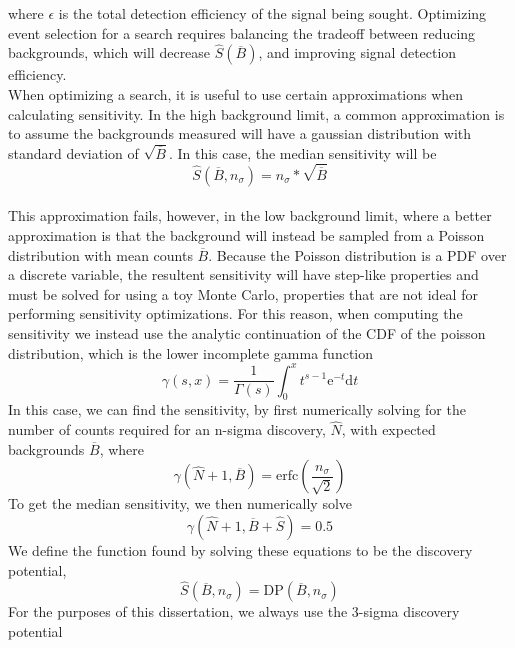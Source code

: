 \documentclass[/main.tex]{subfiles}
\begin{document}
where $\epsilon$ is the total detection efficiency of the signal being sought.
Optimizing event selection for a search requires balancing the tradeoff between reducing backgrounds, which will decrease $\hat{S}(\overline{B})$, and improving signal detection efficiency.
\\
When optimizing a search, it is useful to use certain approximations when calculating sensitivity.
In the high background limit, a common approximation is to assume the backgrounds measured will have a gaussian distribution with standard deviation of $\sqrt{\overline{B}}$.
In this case, the median sensitivity will be
\begin{equation}
  \hat{S}(\overline{B}, n_\sigma)=n_\sigma * \sqrt{\overline{B}}
\end{equation}
\\
This approximation fails, however, in the low background limit, where a better approximation is that the background will instead be sampled from a Poisson distribution with mean counts $\overline{B}$.
Because the Poisson distribution is a PDF over a discrete variable, the resultent sensitivity will have step-like properties and must be solved for using a toy Monte Carlo, properties that are not ideal for performing sensitivity optimizations.
For this reason, when computing the sensitivity we instead use the analytic continuation of the CDF of the poisson distribution, which is the lower incomplete gamma function
\begin{equation}
  \gamma(s, x)=\frac{1}{\Gamma(s)}\int_0^x t^{s-1} \mathrm{e}^{-t} \mathrm{d}t
\end{equation}
In this case, we can find the sensitivity, by first numerically solving for the number of counts required for an n-sigma discovery, $\hat{N}$, with expected backgrounds $\overline{B}$, where
\begin{equation}
  \gamma(\hat{N}+1, \overline{B}) = \mathrm{erfc}(\frac{n_\sigma}{\sqrt{2}})
\end{equation}
To get the median sensitivity, we then numerically solve
\begin{equation}
  \gamma(\hat{N}+1, \overline{B} + \hat{S}) = 0.5
\end{equation}
We define the function found by solving these equations to be the discovery potential\cite{2013CUORE},
\begin{equation}
  \hat{S}(\overline{B}, n_\sigma) = \mathrm{DP}(\overline{B}, n_\sigma)
\end{equation}
For the purposes of this dissertation, we always use the 3-sigma discovery potential
\end{document}
